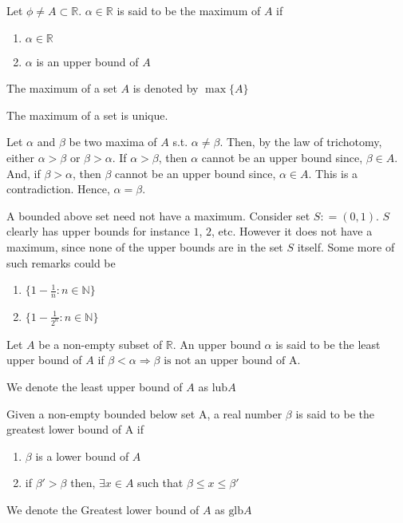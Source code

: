 \documentclass{scrartcl}
\newcommand{\rn}{\mathbb{R}}
\newcommand{\nn}{\mathbb{N}}
\begin{document}
    \begin{definition}[Maximum]
        Let $\phi \neq A \subset \rn$. $\alpha \in \rn$ is said to be the maximum of $A$ if 
        \begin{enumerate}[label={(\roman*)}]
            \item $\alpha \in \rn$
            \item $\alpha$ is an upper bound of $A$ 
        \end{enumerate}
        The maximum of a set $A$ is denoted by $\max\{A\}$
    \end{definition}
    \begin{theorem}
        The maximum of a set is unique.
        \begin{proof*}
            Let $\alpha$ and $\beta$ be two maxima of $A$ s.t. $\alpha \neq \beta$. Then, by the law of trichotomy,
            either $\alpha > \beta$ or $\beta > \alpha$. 
            If $\alpha > \beta$, then $\alpha$ cannot be an upper bound since, $\beta \in A$. And,
            if $\beta > \alpha$, then $\beta$ cannot be an upper bound since, $\alpha \in A$. This is a contradiction. 
            Hence, $\alpha = \beta$.
        \end{proof*}
    \end{theorem}
    \begin{remark}
        A bounded above set need not have a maximum. Consider set $S : = (0,1)$. $S$ clearly has upper bounds
        for instance $1$, $2$, etc. However it does not have a maximum, since none of the upper bounds are in the set $S$ itself. Some more of such remarks could be
        \begin{enumerate}
            \item $\{ 1 - \frac{1}{n} : n \in \nn\}$
            \item $\{1 - \frac{1}{2^n} : n \in \nn \}$
        \end{enumerate}
    \end{remark}
    \begin{definition}
        Let $A$ be a non-empty subset of $\rn$. An upper bound $\alpha$ is said to be the least upper bound of $A$
        if $\beta < \alpha \Rightarrow \beta \text{ is not an upper bound of A.}$

        We denote the least upper bound of $A$ as $\text{lub}A$
    \end{definition}
    \begin{definition}
        Given a non-empty bounded below set A, a real number $\beta$ is said to be the greatest lower bound of A if 
        \begin{enumerate}[label={(\roman*)}]
            \item $\beta$ is a lower bound of $A$
            \item if $\beta' > \beta$ then, $\exists x \in A$ such that $\beta \leq x \leq \beta'$
        \end{enumerate}

        We denote the Greatest lower bound of $A$ as $\text{glb}A$
    \end{definition}
\end{document}

